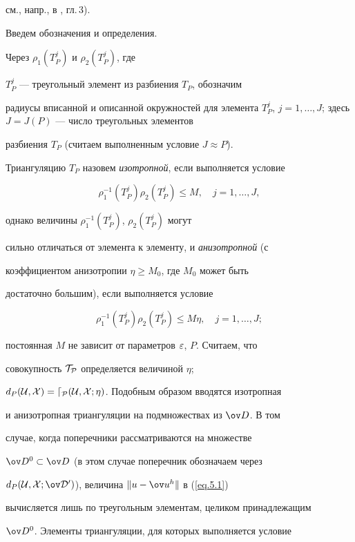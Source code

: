 см., напр., в \cite{10}, гл.\,3).





Введем обозначения и определения.


Через $\rho_1(T_P^j)$ и $\rho_2(T_P^j)$, где


$T_P^j$ --- треугольный элемент из разбиения $T_P$, обозначим


радиусы вписанной и описанной окружностей для элемента $T_P^j$, $j


= 1,\dotsc,J$; здесь $J=J(P)$ --- число треугольных элементов


разбиения $T_P$ (считаем выполненным условие $J\approx P$).


Триангуляцию $T_P$ назовем {\it изотропной}, если выполняется условие


$$


\rho_1^{-1}(T_P^j)\rho_2(T_P^j)\leq M,\quad j=1,\dotsc,J,


$$


однако величины $\rho_1^{-1}(T_P^j)$, $\rho_2(T_P^j)$ могут


сильно отличаться от элемента к элементу, и {\it анизотропной} (с


коэффициентом анизотропии $\eta\geq M_0$, где $M_0$ может быть


достаточно большим), если выполняется условие


$$


\rho_1^{-1}(T_P^j)\rho_2(T_P^j)\leq M\eta,\quad j=1,\dotsc,J;


$$


постоянная $M$ не зависит от параметров $\varepsilon$, $P$. Считаем, что


совокупность $\cal{T}_P$ определяется величиной $\eta$;


$d_P(\cal{U},X)=d_P(\cal{U},X;\eta)$. Подобным образом вводятся изотропная


и анизотропная триангуляции на подмножествах из $\od$. В том


случае, когда поперечники рассматриваются на множестве


$\od{}^0\subset\od$ (в этом случае поперечник обозначаем через


$d_P(\cu,X;\od{}^0)$), величина $\|u-\ov u{}^h\|$ в (\ref{eq.5.1})


вычисляется лишь по треугольным элементам, целиком принадлежащим


$\od{}^0$. Элементы триангуляции, для которых выполняется условие


$$


